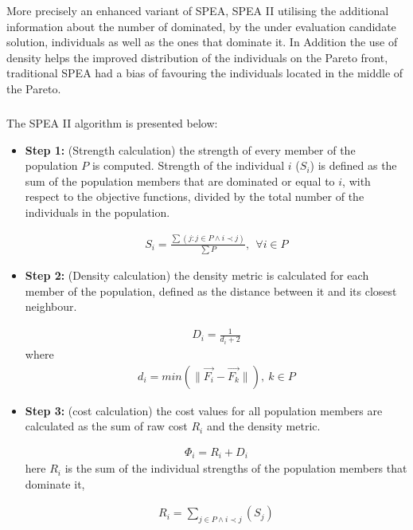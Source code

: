 More precisely an enhanced variant of SPEA, SPEA II \cite{Zitz02,Zitz01} utilising the additional information about the number of dominated, by the under evaluation candidate solution, individuals as well as the ones that dominate it. In Addition the use of density  helps the improved distribution of the individuals on the Pareto front, traditional SPEA had a bias of favouring the individuals located in the middle of the Pareto. 

\subparagraph{} The SPEA II algorithm is presented below:

\begin{itemize}
\item[]{\bf Step 1:}  (Strength calculation) the strength of every member of the population $P$ is computed. Strength of the individual $i$ ($S_i$) is defined as the sum of the population members that are dominated or equal to $i$, with respect to the objective functions, divided by the total number of the individuals in the population.  
 

\begin{eqnarray}
	S_i = \frac{\sum(j : j \in P \wedge i \prec j)} {\sum P}, ~~ \forall i \in P  
\end{eqnarray}

\item[]{\bf Step 2:}  (Density calculation) the density metric is calculated for each member of the population, defined as the distance between it and its closest neighbour.

\begin{eqnarray}
	D_i = \frac{1} {d_i+2} 
\end{eqnarray}
where
\begin{eqnarray}
	\nonumber
	d_i= min (\parallel \vec{F_i} - \vec{F_k} \parallel), ~ k \in P  
\end{eqnarray}


\item[]{\bf Step 3:}  (cost calculation) the cost values for all population members are calculated as the sum of raw cost $R_i$ and the density metric.

\begin{eqnarray}
	\Phi_i = R_i+D_i
\label{SPEAIIeq}
\end{eqnarray}
here $R_i$ is the sum of the individual strengths of the population members that dominate it,
  
\begin{eqnarray}
	\nonumber
	R_i=\sum _{j \in P \wedge i \prec j}(S_j)  
\end{eqnarray}  
\end{itemize}

